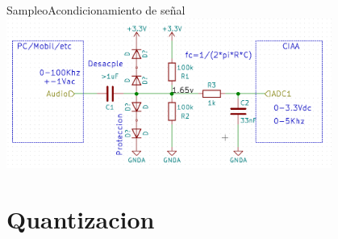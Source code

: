 \begin{darkframes}
\begin{frame}{Sampleo}{Acondicionamiento de señal}
         \protoboardicon
         \center\includegraphics[width=0.8\textwidth]{1_clase/circuito}
         \vfill
      \end{frame}
      \section{Quantizacion}

\end{darkframes}
